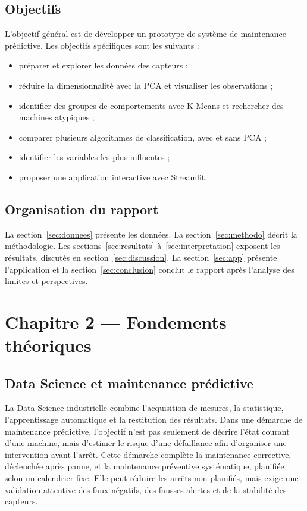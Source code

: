 \documentclass[12pt,a4paper]{article}
\begin{document}
\subsection{Objectifs}
L'objectif général est de développer un prototype de système de maintenance prédictive. Les objectifs spécifiques sont les suivants :
\begin{itemize}[noitemsep]
  \item préparer et explorer les données des capteurs ;
  \item réduire la dimensionnalité avec la PCA et visualiser les observations ;
  \item identifier des groupes de comportements avec K-Means et rechercher des machines atypiques ;
  \item comparer plusieurs algorithmes de classification, avec et sans PCA ;
  \item identifier les variables les plus influentes ;
  \item proposer une application interactive avec Streamlit.
\end{itemize}

\subsection{Organisation du rapport}
La section~\ref{sec:donnees} présente les données. La section~\ref{sec:methodo} décrit la méthodologie. Les sections~\ref{sec:resultats} à~\ref{sec:interpretation} exposent les résultats, discutés en section~\ref{sec:discussion}. La section~\ref{sec:app} présente l'application et la section~\ref{sec:conclusion} conclut le rapport après l'analyse des limites et perspectives.

\section{Chapitre 2 — Fondements théoriques}\label{sec:theorie}

\subsection{Data Science et maintenance prédictive}
La Data Science industrielle combine l'acquisition de mesures, la statistique, l'apprentissage automatique et la restitution des résultats. Dans une démarche de maintenance prédictive, l'objectif n'est pas seulement de décrire l'état courant d'une machine, mais d'estimer le risque d'une défaillance afin d'organiser une intervention avant l'arrêt. Cette démarche complète la maintenance corrective, déclenchée après panne, et la maintenance préventive systématique, planifiée selon un calendrier fixe. Elle peut réduire les arrêts non planifiés, mais exige une validation attentive des faux négatifs, des fausses alertes et de la stabilité des capteurs.
\end{document}
